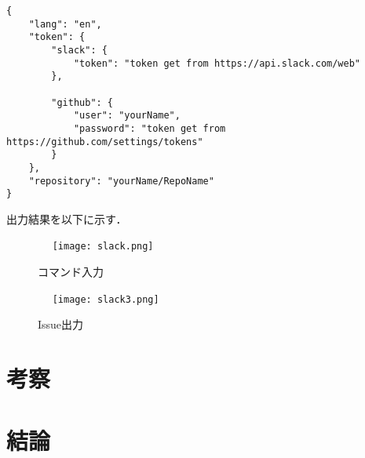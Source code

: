 \begin{verbatim}
{
	"lang": "en",
	"token": {
		"slack": {
			"token": "token get from https://api.slack.com/web"
		},

		"github": {
			"user": "yourName",
			"password": "token get from https://github.com/settings/tokens"
		}
	},
	"repository": "yourName/RepoName"
}

\end{verbatim}
出力結果を以下に示す．
\begin{figure}[htb]
\centering　
\texttt{[image: slack.png]}
\caption{コマンド入力}\label{tab:botの起動}
\end{figure}
\begin{figure}[htb]
\centering　
\texttt{[image: slack3.png]}
\caption{Issue出力}\label{tab:botの起動}
\end{figure}


\chapter{考察}

\chapter{結論}












